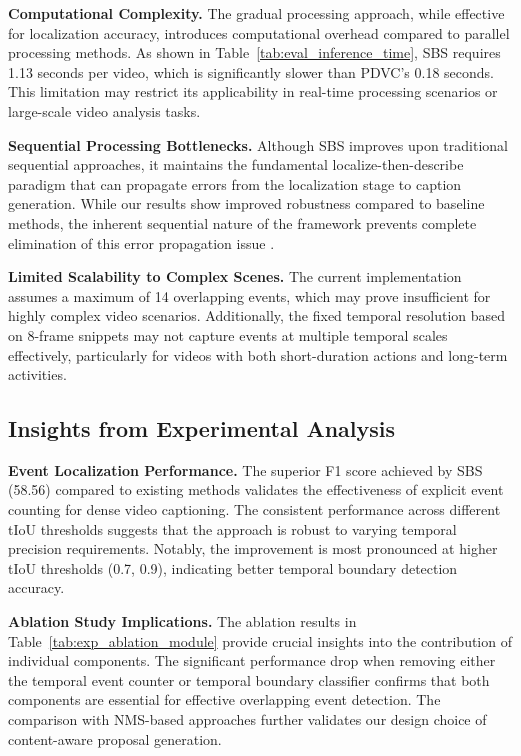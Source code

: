 \textbf{Computational Complexity.}
The gradual processing approach, while effective for localization accuracy, introduces computational overhead compared to parallel processing methods. As shown in Table~\ref{tab:eval_inference_time}, SBS requires 1.13 seconds per video, which is significantly slower than PDVC's 0.18 seconds. This limitation may restrict its applicability in real-time processing scenarios or large-scale video analysis tasks.

\textbf{Sequential Processing Bottlenecks.}
Although SBS improves upon traditional sequential approaches, it maintains the fundamental localize-then-describe paradigm that can propagate errors from the localization stage to caption generation. While our results show improved robustness compared to baseline methods, the inherent sequential nature of the framework prevents complete elimination of this error propagation issue \cite{wang2021end}.

\textbf{Limited Scalability to Complex Scenes.}
The current implementation assumes a maximum of 14 overlapping events, which may prove insufficient for highly complex video scenarios. Additionally, the fixed temporal resolution based on 8-frame snippets may not capture events at multiple temporal scales effectively, particularly for videos with both short-duration actions and long-term activities.

\subsection{Insights from Experimental Analysis}

\textbf{Event Localization Performance.}
The superior F1 score achieved by SBS (58.56) compared to existing methods validates the effectiveness of explicit event counting for dense video captioning. The consistent performance across different tIoU thresholds suggests that the approach is robust to varying temporal precision requirements. Notably, the improvement is most pronounced at higher tIoU thresholds (0.7, 0.9), indicating better temporal boundary detection accuracy.

\textbf{Ablation Study Implications.}
The ablation results in Table~\ref{tab:exp_ablation_module} provide crucial insights into the contribution of individual components. The significant performance drop when removing either the temporal event counter or temporal boundary classifier confirms that both components are essential for effective overlapping event detection. The comparison with NMS-based approaches further validates our design choice of content-aware proposal generation.

